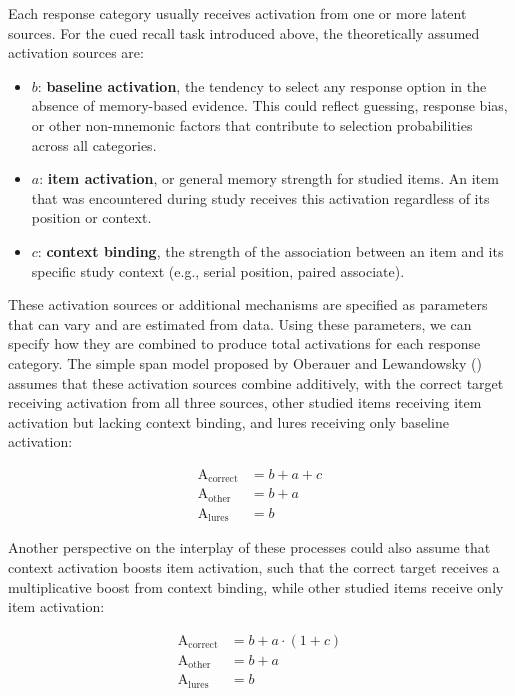 \documentclass[
  man,
  floatsintext,
  longtable,
  nolmodern,
  notxfonts,
  notimes,
  colorlinks=true,linkcolor=blue,citecolor=blue,urlcolor=blue]{apa7}
\providecommand{\tightlist}{%
  \setlength{\itemsep}{0pt}\setlength{\parskip}{0pt}}
\begin{document}
Each response category usually receives activation from one or more
latent sources. For the cued recall task introduced above, the
theoretically assumed activation sources are:

\begin{itemize}
\tightlist
\item
  \(b\): \textbf{baseline activation}, the tendency to select any
  response option in the absence of memory-based evidence. This could
  reflect guessing, response bias, or other non-mnemonic factors that
  contribute to selection probabilities across all categories.
\item
  \(a\): \textbf{item activation}, or general memory strength for
  studied items. An item that was encountered during study receives this
  activation regardless of its position or context.
\item
  \(c\): \textbf{context binding}, the strength of the association
  between an item and its specific study context (e.g., serial position,
  paired associate).
\end{itemize}

These activation sources or additional mechanisms are specified as
parameters that can vary and are estimated from data. Using these
parameters, we can specify how they are combined to produce total
activations for each response category. The simple span model proposed
by Oberauer and Lewandowsky ()
assumes that these activation sources combine additively, with the
correct target receiving activation from all three sources, other
studied items receiving item activation but lacking context binding, and
lures receiving only baseline activation:

\[
\begin{aligned}
\text{A}_{\text{correct}} &= b + a + c \\
\text{A}_{\text{other}} &= b + a \\
\text{A}_{\text{lures}} &= b
\end{aligned}
\]

Another perspective on the interplay of these processes could also
assume that context activation boosts item activation, such that the
correct target receives a multiplicative boost from context binding,
while other studied items receive only item activation:

\[
\begin{aligned}
\text{A}_{\text{correct}} &= b + a \cdot (1 + c) \\
\text{A}_{\text{other}} &= b + a \\
\text{A}_{\text{lures}} &= b
\end{aligned}
\]
\end{document}
